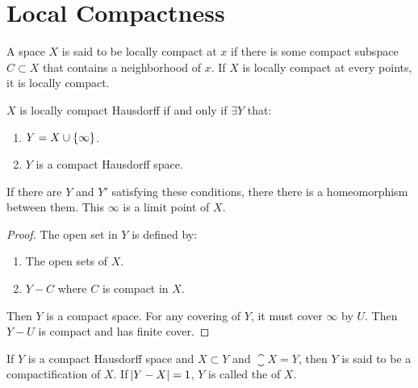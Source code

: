 \section{Local Compactness}

\begin{definition}
    A space $X$ is said to be locally compact at $x$ if there is some compact subspace $C \subset X$ that contains a neighborhood of $x$. If $X$ is locally compact at every points, it is locally compact.
\end{definition}


\begin{theorem}
    $X$ is locally compact Hausdorff if and only if $\exists Y$ that:
    \begin{enumerate}
        \item $Y = X \cup \set{\infty}$.
        \item $Y$ is a compact Hausdorff space.
    \end{enumerate}
    
    If there are $Y$ and $Y'$ satisfying these conditions, there there is a homeomorphism between them. This $\infty$ is a limit point of $X$.
\end{theorem}
\begin{proof}
    The open set in $Y$ is defined by:
    \begin{enumerate}
        \item The open sets of $X$.
        \item $Y -C$ where $C$ is compact in $X$.
    \end{enumerate}
    
    Then $Y$ is a compact space. For any covering of $Y$, it must cover $\infty$ by $U$. Then $Y-U$ is compact and has finite cover.
\end{proof}

\begin{definition}
    If $Y$ is a compact Hausdorff space and $X \subset Y$ and $\closure{X} = Y$, then $Y$ is said to be a compactification of $X$. If $\abs{Y - X} = 1$, $Y$ is called the  of $X$.
\end{definition}

